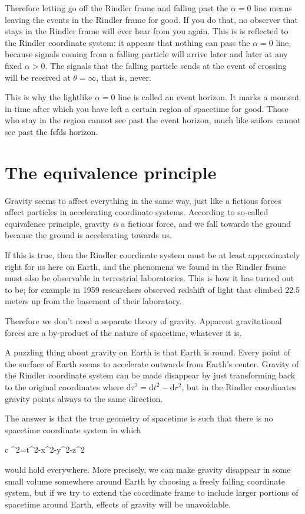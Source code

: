 \documentclass[11pt,oneside%
]{memoir}
\newenvironment{eqna}{\begin{IEEEeqnarray*}{c}}{\end{IEEEeqnarray*}\ignorespacesafterend}
\newcommand{\dd}{\mathrm{d}}
\begin{document}
Therefore letting go off the Rindler frame and falling past the \(\alpha=0\) line means leaving the events in the Rindler frame for good. If you do that, no observer that stays in the Rindler frame will ever hear from you again. This is is reflected to the Rindler coordinate system: it appears that nothing can pass the \(\alpha=0\) line, because signals coming from a falling particle will arrive later and later at any fixed \(\alpha>0\). The signals that the falling particle sends at the event of crossing will be received at \(\theta=\infty\), that is, never.

This is why the lightlike \(\alpha=0\) line is called an event horizon. It marks a moment in time after which you have left a certain region of spacetime for good. Those who stay in the region cannot see past the event horizon, much like sailors cannot see past the fsfds horizon.

\section{The equivalence principle}

Gravity seems to affect everything in the same way, just like a fictious forces affect particles in accelerating coordinate systems. According to so-called equivalence principle, gravity \emph{is} a fictious force, and we fall towards the ground because the ground is accelerating towards us.

If this is true, then the Rindler coordinate system must be at least approximately right for us here on Earth, and the phenomena we found in the Rindler frame must also be observable in terrestrial laboratories. This is how it has turned out to be; for example in 1959 researchers observed redshift of light that climbed 22.5 meters up from the basement of their laboratory.

Therefore we don't need a separate theory of gravity. Apparent gravitational forces are a by-product of the nature of spacetime, whatever it is.

A puzzling thing about gravity on Earth is that Earth is round. Every point of the surface of Earth seems to accelerate outwards from Earth's center. Gravity of the Rindler coordinate system can be made disappear by just transforming back to the original coordinates where \(\dd\tau^2=\dd t^2-\dd r^2\), but in the Rindler coordinates gravity points always to the same direction.

The answer is that the true geometry of spacetime is such that there is no spacetime coordinate system in which
\begin{eqna}
\dd\tau^2=\dd t^2-\dd x^2-\dd y^2-\dd z^2
\end{eqna}
would hold everywhere. More precisely, we can make gravity disappear in some small volume somewhere around Earth by choosing a freely falling coordinate system, but if we try to extend the coordinate frame to include larger portions of spacetime around Earth, effects of gravity will be unavoidable.
\end{document}
